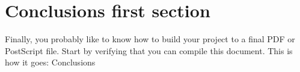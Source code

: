 \section{Conclusions first section}
Finally, you probably like to know how to build your project to a
final PDF or PostScript file. Start by verifying that you can
compile this document. This is how it goes:
Conclusions
%
%
%
%
%
%
%
%
%
